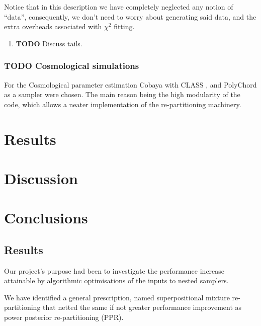 \documentclass[usenatbib]{mnras}
\begin{document}
Notice that in this description we have completely neglected any
notion of ``data'', consequently, we don't need to worry about
generating said data, and the extra overheads associated with
\(\chi^2\) fitting.
\begin{enumerate}
\item {\bfseries\sffamily TODO} Discuss tails.
\label{sec:org6af4a15}
\end{enumerate}
\subsubsection{{\bfseries\sffamily TODO} Cosmological simulations}
\label{sec:org8f6751b}
For the Cosmological parameter estimation Cobaya \citep{cobaya} with
CLASS \citep{Blas_2011}, and PolyChord \citep{polychord} as a sampler
were chosen. The main reason being the high modularity of the code,
which allows a neater implementation of the re-partitioning
machinery.
\section{Results}
\label{sec:orge33d6ef}
\section{Discussion}
\label{sec:org1ac7985}
\section{Conclusions}
\label{sec:orgbdaf38f}

\subsection{Results}
\label{sec:orgcf79dde}
Our project's purpose had been to investigate the performance
increase attainable by algorithmic optimisations of the inputs to
nested samplers. 

We have identified a general prescription, named superpositional
mixture re-partitioning that netted the same if not greater
performance improvement as power posterior re-partitioning (PPR). 
\end{document}

